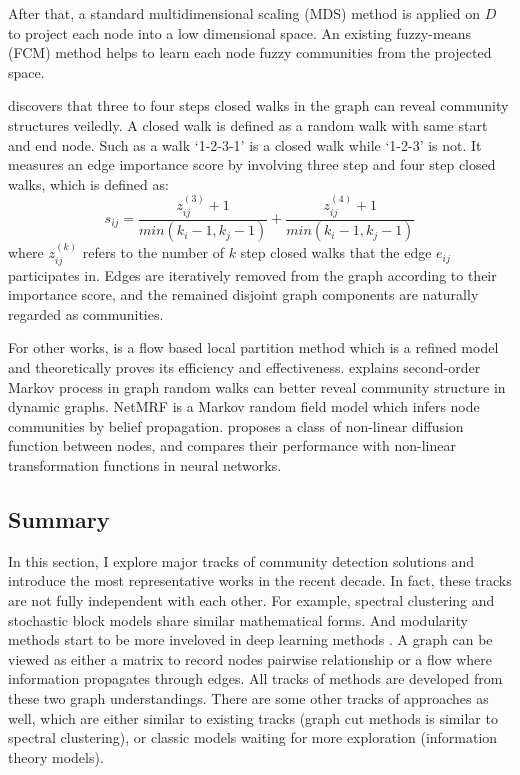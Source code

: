 After that, a standard multidimensional scaling (MDS) method is applied on $D$ to project each node into a low dimensional space. An existing fuzzy-means (FCM) method helps to learn each node fuzzy communities from the projected space.

\cite{yang2014closed} discovers that three to four steps closed walks in the graph can reveal community structures veiledly. A closed walk is defined as a random walk with same start and end node. Such as a walk `1-2-3-1' is a closed walk while `1-2-3' is not. It measures an edge importance score by involving three step and four step closed walks, which is defined as:
\begin{equation}
	s_{ij} = \frac{z_{ij}^{(3)}+1}{min(k_i-1,k_j-1)} + \frac{z_{ij}^{(4)}+1}{min(k_i-1,k_j-1)}
\end{equation}
where $z_{ij}^{(k)}$ refers to the number of $k$ step closed walks that the edge $e_{ij}$ participates in. Edges are iteratively removed from the graph according to their importance score, and the remained disjoint graph components are naturally regarded as communities. 

 For other works, \cite{orecchia2014flow} is a flow based local partition method which is a refined model and theoretically proves its efficiency and effectiveness.  \cite{salnikov2016using} explains second-order Markov process in graph random walks can better reveal community structure in dynamic graphs.  NetMRF \cite{he2018network} is a Markov random field model which infers node communities by belief propagation.  \cite{ibrahim2019nonlinear} proposes a class of non-linear diffusion function between nodes, and compares their performance with non-linear transformation functions in neural networks. 

\subsection{Summary}
In this section, I explore major tracks of community detection solutions and introduce the most representative works in the recent decade. In fact, these tracks are not fully independent with each other. For example, spectral clustering and stochastic block models share similar mathematical forms. And modularity methods start to be more inveloved in deep learning methods . A graph can be viewed as either a matrix to record nodes pairwise relationship or a flow where information propagates through edges. All tracks of methods are developed from these two graph understandings. There are some other tracks of approaches as well, which are either similar to existing tracks (graph cut methods is similar to spectral clustering), or classic models waiting for more exploration (information theory models).